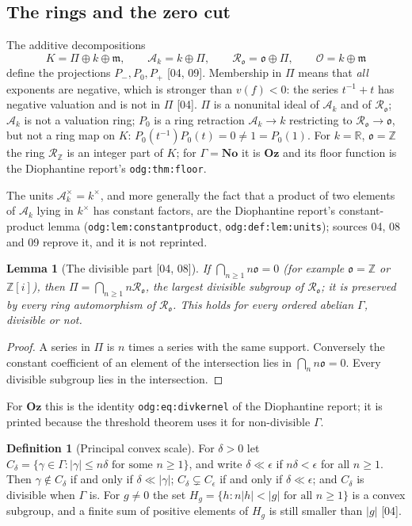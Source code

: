 \documentclass[11pt,oneside]{article}
\numberwithin{equation}{section}
\newtheorem{lemma}[lemma]{Lemma}
\theoremstyle{definition}
\newtheorem{definition}[definition]{Definition}
\theoremstyle{remark}
\newcommand{\No}{\mathbf{No}}
\newcommand{\Oz}{\mathbf{Oz}}
\newcommand{\R}{\mathbb R}
\newcommand{\Z}{\mathbb Z}
\newcommand{\oo}{\mathfrak o}
\newcommand{\Ak}{\mathcal A_k}
\newcommand{\Ro}{\mathcal R_{\oo}}
\newcommand{\OO}{\mathcal O}
\newcommand{\mm}{\mathfrak m}
\newcommand{\bb}{\mathbin{\ll}}
\newcommand{\src}[1]{\textup{\textsf{\small[#1]}}}
\newcommand{\lbl}[1]{\nolinkurl{#1}}
\begin{document}
\subsection{The rings and the zero cut}

The additive decompositions
\begin{equation}\label{opa:eq:decomp}
 K=\Pi\oplus k\oplus\mm,\qquad \Ak=k\oplus\Pi,\qquad \Ro=\oo\oplus\Pi,
 \qquad \OO=k\oplus\mm
\end{equation}
define the projections $P_-,P_0,P_+$ \src{04, 09}. Membership in $\Pi$ means
that \emph{all} exponents are negative, which is stronger than $v(f)<0$: the
series $t^{-1}+t$ has negative valuation and is not in $\Pi$ \src{04}. $\Pi$ is
a nonunital ideal of $\Ak$ and of $\Ro$; $\Ak$ is not a valuation ring; $P_0$ is
a ring retraction $\Ak\to k$ restricting to $\Ro\to\oo$, but not a ring map on
$K$: $P_0(t^{-1})P_0(t)=0\ne1=P_0(1)$. For $k=\R$, $\oo=\Z$ the ring $\mathcal
R_\Z$ is an integer part of $K$; for $\Gamma=\No$ it is $\Oz$ and its floor
function is the Diophantine report's \lbl{odg:thm:floor}.

The units $\Ak^\times=k^\times$, and more generally the fact that a product of
two elements of $\Ak$ lying in $k^\times$ has constant factors, are the
Diophantine report's constant-product lemma (\lbl{odg:lem:constantproduct},
\lbl{odg:def:lem:units}); sources 04, 08 and 09 reprove it, and it is not
reprinted.

\begin{lemma}[The divisible part \src{04, 08}]\label{opa:lem:divisible}
If $\bigcap_{n\ge1}n\oo=0$ (for example $\oo=\Z$ or $\Z[i]$), then
$\Pi=\bigcap_{n\ge1}n\Ro$, the largest divisible subgroup of $\Ro$; it is
preserved by every ring automorphism of $\Ro$. This holds for every ordered
abelian $\Gamma$, divisible or not.
\end{lemma}
\begin{proof}
A series in $\Pi$ is $n$ times a series with the same support. Conversely the
constant coefficient of an element of the intersection lies in
$\bigcap_n n\oo=0$. Every divisible subgroup lies in the intersection.
\end{proof}

For $\Oz$ this is the identity \lbl{odg:eq:divkernel} of the Diophantine
report; it is printed because the threshold theorem uses it
for non-divisible $\Gamma$.

\begin{definition}[Principal convex scale]\label{opa:def:convex}
For $\delta>0$ let $C_\delta=\{\gamma\in\Gamma:|\gamma|\le n\delta\text{ for some }
n\ge1\}$, and write $\delta\bb\epsilon$ if $n\delta<\epsilon$ for all $n\ge1$.
Then $\gamma\notin C_\delta$ if and only if $\delta\bb|\gamma|$;
$C_\delta\subsetneq C_\epsilon$ if and only if $\delta\bb\epsilon$; and
$C_\delta$ is divisible when $\Gamma$ is. For $g\ne0$ the set
$H_g=\{h:n|h|<|g|\text{ for all }n\ge1\}$ is a convex subgroup, and a finite
sum of positive elements of $H_g$ is still smaller than $|g|$ \src{04}.
\end{definition}
\end{document}
